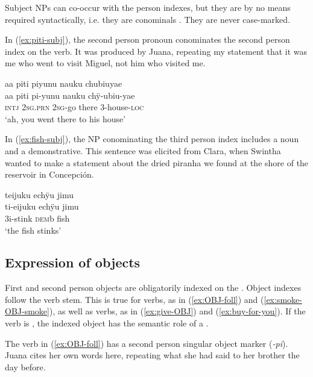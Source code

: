 Subject NPs can co-occur with the person indexes, but they are by no means required syntactically, i.e. they are conominals \citep[cf.][217]{Haspelmath2013}. They are never case-marked.

In (\ref{ex:piti-subj}), the second person pronoun conominates the second person index on the verb. It was produced by Juana, repeating my statement that it was me who went to visit Miguel, not him who visited me.

\ea\label{ex:piti-subj}
\begingl
\glpreamble aa piti piyunu nauku chubiuyae\\
\gla aa piti pi-yunu nauku chÿ-ubiu-yae\\
\glb \textsc{intj} 2\textsc{sg.prn} 2\textsc{sg}-go there 3-house-\textsc{loc}\\
\glft ‘ah, you went there to his house’
\endgl
\trailingcitation{[jxx-e110923l-1.028]}
\xe

In (\ref{ex:fish-subj}), the NP conominating the third person index includes a noun and a demonstrative. This sentence was elicited from Clara, when Swintha wanted to make a statement about the dried piranha we found at the shore of the reservoir in Concepción.

\ea\label{ex:fish-subj}
\begingl
\glpreamble teijuku echÿu jimu\\
\gla ti-eijuku echÿu jimu\\
\glb 3i-stink \textsc{dem}b fish\\
\glft ‘the fish stinks’
\endgl
\trailingcitation{[cux-c120414ls-2.111]}
\xe


\subsection{Expression of objects}\label{sec:ExpressionObjects}

First and second person objects are obligatorily indexed on the . Object indexes follow the verb stem. This is true for  verbs, as in (\ref{ex:OBJ-foll}) and (\ref{ex:smoke-OBJ-smoke}), as well as  verbs, as in (\ref{ex:give-OBJ}) and (\ref{ex:buy-for-you}). If the verb is , the indexed object has the semantic role of a .

The verb in (\ref{ex:OBJ-foll}) has a second person singular object marker (\textit{-pi}). Juana cites her own words here, repeating what she had said to her brother the day before. %

